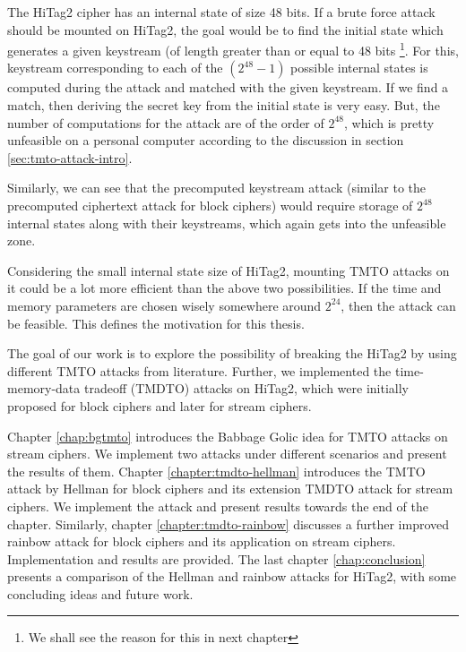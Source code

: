 The HiTag2 cipher has an internal state of size 48 bits. If a brute force attack should be mounted on HiTag2, the goal would be to find the initial state which generates a given keystream (of length greater than or equal to 48 bits \footnote{We shall see the reason for this in next chapter}. For this, keystream corresponding to each of the $(2^{48} - 1)$ possible internal states is computed during the attack and matched with the given keystream. If we find a match, then deriving the secret key from the initial state is very easy. But, the number of computations for the attack are of the order of $2^{48}$, which is pretty unfeasible on a personal computer according to the discussion in section \ref{sec:tmto-attack-intro}. 

Similarly, we can see that the precomputed keystream attack (similar to the precomputed ciphertext attack for block ciphers) would require storage of $2^{48}$ internal states along with their keystreams, which again gets into the unfeasible zone. 

Considering the small internal state size of HiTag2, mounting TMTO attacks on it could be a lot more efficient than the above two possibilities. If the time and memory parameters are chosen wisely somewhere around $2^{24}$, then the attack can be feasible. This defines the motivation for this thesis.

The goal of our work is to explore the possibility of breaking the HiTag2 by using different TMTO attacks from literature. Further, we implemented the time-memory-data tradeoff (TMDTO) attacks on HiTag2, which were initially proposed for block ciphers and later for stream ciphers.

Chapter \ref{chap:bgtmto} introduces the Babbage Golic idea for TMTO attacks on stream ciphers. We implement two attacks under different scenarios and present the results of them. Chapter \ref{chapter:tmdto-hellman} introduces the TMTO attack by Hellman for block ciphers and its extension TMDTO attack for stream ciphers. We implement the attack and present results towards the end of the chapter. Similarly, chapter \ref{chapter:tmdto-rainbow} discusses a further improved rainbow attack for block ciphers and its application on stream ciphers. Implementation and results are provided. The last chapter \ref{chap:conclusion} presents a comparison of the Hellman and rainbow attacks for HiTag2, with some concluding ideas and future work. 
